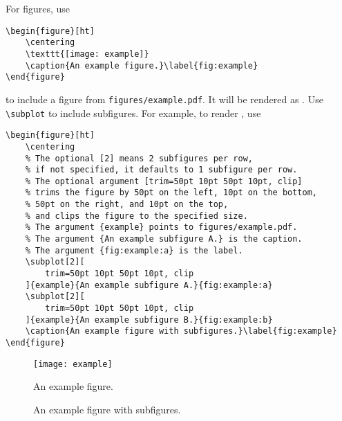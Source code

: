 For figures,
use
\begin{verbatim}
\begin{figure}[ht]
    \centering
    \texttt{[image: example]}
    \caption{An example figure.}\label{fig:example}
\end{figure}
\end{verbatim}
to include a figure
from \verb|figures/example.pdf|.
It will be rendered as .
Use \verb|\subplot| to include subfigures.
For example,
to render ,
use
\begin{verbatim}
\begin{figure}[ht]
    \centering
    % The optional [2] means 2 subfigures per row,
    % if not specified, it defaults to 1 subfigure per row.
    % The optional argument [trim=50pt 10pt 50pt 10pt, clip]
    % trims the figure by 50pt on the left, 10pt on the bottom,
    % 50pt on the right, and 10pt on the top,
    % and clips the figure to the specified size.
    % The argument {example} points to figures/example.pdf.
    % The argument {An example subfigure A.} is the caption.
    % The argument {fig:example:a} is the label.
    \subplot[2][
        trim=50pt 10pt 50pt 10pt, clip
    ]{example}{An example subfigure A.}{fig:example:a}
    \subplot[2][
        trim=50pt 10pt 50pt 10pt, clip
    ]{example}{An example subfigure B.}{fig:example:b}
    \caption{An example figure with subfigures.}\label{fig:example}
\end{figure}
\end{verbatim}

\begin{figure}[ht]
    \centering
    \texttt{[image: example]}
    \caption{An example figure.}\label{fig:example}
\end{figure}
\begin{figure}[ht]
    \centering
    \hpad
    \caption{An example figure with subfigures.}\label{fig:subfigs}
\end{figure}


